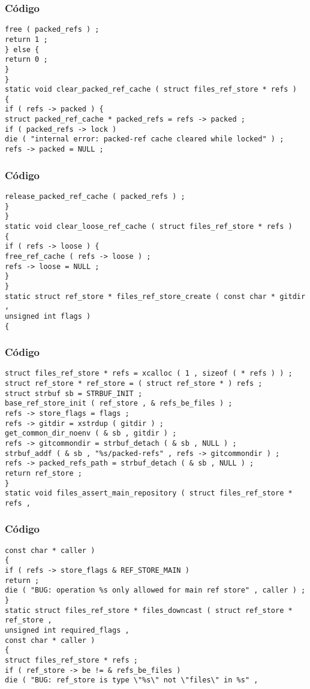 \documentclass{beamer}
\begin{document}
\begin{frame}[fragile]
\frametitle{C\'odigo}
\begin{verbatim}
free ( packed_refs ) ; 
return 1 ; 
} else { 
return 0 ; 
} 
} 
static void clear_packed_ref_cache ( struct files_ref_store * refs ) 
{ 
if ( refs -> packed ) { 
struct packed_ref_cache * packed_refs = refs -> packed ; 
if ( packed_refs -> lock ) 
die ( "internal error: packed-ref cache cleared while locked" ) ; 
refs -> packed = NULL ; 
\end{verbatim}
\end{frame}
\begin{frame}[fragile]
\frametitle{C\'odigo}
\begin{verbatim}
release_packed_ref_cache ( packed_refs ) ; 
} 
} 
static void clear_loose_ref_cache ( struct files_ref_store * refs ) 
{ 
if ( refs -> loose ) { 
free_ref_cache ( refs -> loose ) ; 
refs -> loose = NULL ; 
} 
} 
static struct ref_store * files_ref_store_create ( const char * gitdir , 
unsigned int flags ) 
{ 
\end{verbatim}
\end{frame}
\begin{frame}[fragile]
\frametitle{C\'odigo}
\begin{verbatim}
struct files_ref_store * refs = xcalloc ( 1 , sizeof ( * refs ) ) ; 
struct ref_store * ref_store = ( struct ref_store * ) refs ; 
struct strbuf sb = STRBUF_INIT ; 
base_ref_store_init ( ref_store , & refs_be_files ) ; 
refs -> store_flags = flags ; 
refs -> gitdir = xstrdup ( gitdir ) ; 
get_common_dir_noenv ( & sb , gitdir ) ; 
refs -> gitcommondir = strbuf_detach ( & sb , NULL ) ; 
strbuf_addf ( & sb , "%s/packed-refs" , refs -> gitcommondir ) ; 
refs -> packed_refs_path = strbuf_detach ( & sb , NULL ) ; 
return ref_store ; 
} 
static void files_assert_main_repository ( struct files_ref_store * refs , 
\end{verbatim}
\end{frame}
\begin{frame}[fragile]
\frametitle{C\'odigo}
\begin{verbatim}
const char * caller ) 
{ 
if ( refs -> store_flags & REF_STORE_MAIN ) 
return ; 
die ( "BUG: operation %s only allowed for main ref store" , caller ) ; 
} 
static struct files_ref_store * files_downcast ( struct ref_store * ref_store , 
unsigned int required_flags , 
const char * caller ) 
{ 
struct files_ref_store * refs ; 
if ( ref_store -> be != & refs_be_files ) 
die ( "BUG: ref_store is type \"%s\" not \"files\" in %s" , 
\end{verbatim}
\end{frame}
\end{document}
